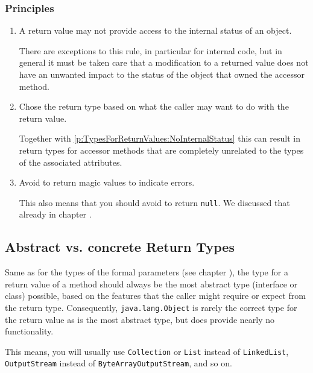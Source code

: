 \subsubsection{Principles}
\begin{enumerate}[label=P\arabic*.]
\item{A return value may not provide access to the internal status of an object.

There are exceptions to this rule, in particular for internal code, but in general it must be taken care that a modification to a returned value does not have an unwanted impact to the status of the object that owned the accessor method.}\label{p:TypesForReturnValues:NoInternalStatus}

\item{Chose the return type based on what the caller may want to do with the return value.

Together with \ref{p:TypesForReturnValues:NoInternalStatus} this can result in return types for accessor methods that are completely unrelated to the types of the associated attributes.}

\item{Avoid to return magic values to indicate errors.

This also means that you should avoid to return \lstinline|null|. We discussed that already in chapter .}
\end{enumerate}


\subsection{Abstract vs. concrete Return Types}\label{sec:ReturnTypes}
Same as for the types of the formal parameters (see chapter ), the type for a return value of a method should always be the most abstract type (interface or class) possible, based on the features that the caller might require or expect from the return type. Consequently, \lstinline|java.lang.Object| is rarely the correct type for the return value as is the most abstract type, but does provide nearly no functionality.

This means, you will usually use \lstinline|Collection| or \lstinline|List| instead of \lstinline|LinkedList|, \lstinline|OutputStream| instead of \lstinline|ByteArrayOutputStream|\autocite{ORACLE_DOC_BYTEARRAYOUTPUTSTREAM_CLASS}, and so on.

